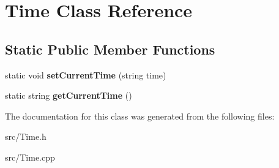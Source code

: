 \hypertarget{class_time}{}\section{Time Class Reference}
\label{class_time}
\subsection*{Static Public Member Functions}
\begin{DoxyCompactItemize}
\item 
\mbox{\label{class_time_a01febf5c2528829c56eca9abbda9974a}} 
static void {\bfseries set\+Current\+Time} (string time)
\item 
\mbox{\label{class_time_ab6e399daf85a2a3f2b69aa0715201930}} 
static string {\bfseries get\+Current\+Time} ()
\end{DoxyCompactItemize}


The documentation for this class was generated from the following files\+:\begin{DoxyCompactItemize}
\item 
src/Time.\+h\item 
src/Time.\+cpp\end{DoxyCompactItemize}
